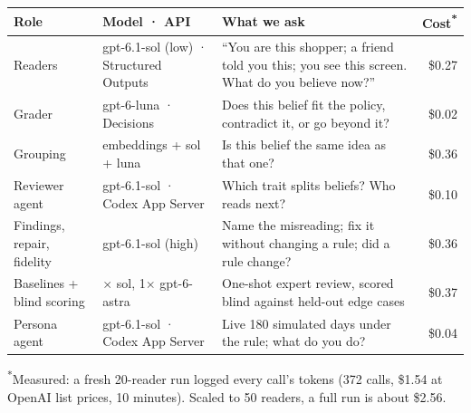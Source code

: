 \documentclass[11pt,a4paper]{article}
\begin{document}
\noindent\begin{minipage}{\linewidth}
\begin{tabularx}{\linewidth}{@{}>{\raggedright\arraybackslash}p{3.3cm}>{\raggedright\arraybackslash}p{3.9cm}Xr@{}}
\toprule
\textbf{Role} & \textbf{Model · API} & \textbf{What we ask} & \textbf{Cost\textsuperscript{*}} \\
\midrule
Readers & gpt-6.1-sol (low) · Structured Outputs & ``You are this shopper; a friend told you this; you see this screen. What do you believe now?'' & \$0.27 \\
Grader & gpt-6-luna · Decisions & Does this belief fit the policy, contradict it, or go beyond it? & \$0.02 \\
Grouping & embeddings + sol + luna & Is this belief the same idea as that one? & \$0.36 \\
Reviewer agent & gpt-6.1-sol · Codex App Server & Which trait splits beliefs? Who reads next? & \$0.10 \\
Findings, repair, fidelity & gpt-6.1-sol (high) & Name the misreading; fix it without changing a rule; did a rule change? & \$0.36 \\
Baselines + blind scoring & 3$\times$ sol, 1$\times$ gpt-6-astra & One-shot expert review, scored blind against held-out edge cases & \$0.37 \\
Persona agent & gpt-6.1-sol · Codex App Server & Live 180 simulated days under the rule; what do you do? & \$0.04 \\
\bottomrule
\end{tabularx}
{\footnotesize\color{muted}\textsuperscript{*}Measured: a fresh 20-reader run logged every call's tokens (372 calls, \$1.54 at OpenAI list prices, 10 minutes). Scaled to 50 readers, a full run is about \$2.56.}
\end{minipage}
\end{document}
